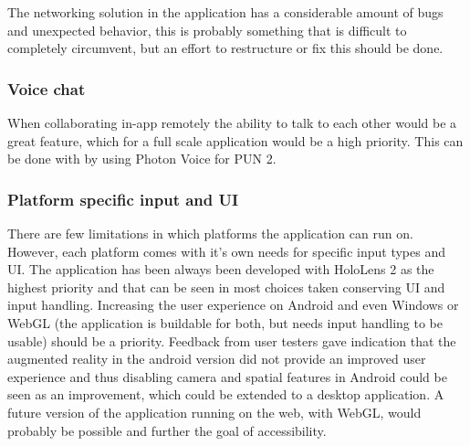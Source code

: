 The networking solution in the application has a considerable amount of bugs and unexpected behavior, this is probably something that is difficult to completely circumvent, but an effort to restructure or fix this should be done.


\subsubsection*{Voice chat}

When collaborating in-app remotely the ability to talk to each other would be a great feature, which for a full scale application would be a high priority. 
This can be done with by using Photon Voice for PUN 2.

\subsubsection*{Platform specific input and UI}
There are few limitations in which platforms the application can run on. However, each platform comes with it's own needs for specific input types and UI. The application has been always been developed with HoloLens 2 as the highest priority and that can be seen in most choices taken conserving UI and input handling. Increasing the user experience on Android and even Windows or WebGL (the application is buildable for both, but needs input handling to be usable) should be a priority. Feedback from user testers gave indication that the augmented reality in the android version did not provide an improved user experience and thus disabling camera and spatial features in Android could be seen as an improvement, which could be extended to a desktop application.
A future version of the application running on the web, with WebGL, would probably be possible and further the goal of accessibility.










